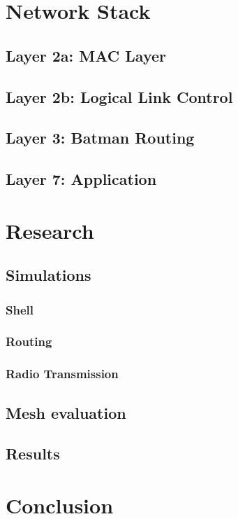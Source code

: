 \chapter{Network Stack}
\section{Layer 2a: MAC Layer}
\section{Layer 2b: Logical Link Control}
\section{Layer 3: Batman Routing}
\section{Layer 7: Application}

\chapter{Research}
\section{Simulations}
\subsection{Shell}
\subsection{Routing}
\subsection{Radio Transmission}
\section{Mesh evaluation}
\section{Results}

\chapter{Conclusion}

